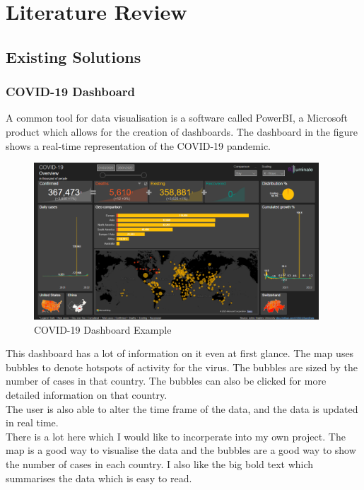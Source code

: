\documentclass{report}
\begin{document}
\newpage

\newpage

\chapter{Literature Review}
\section{Existing Solutions}
\subsection{COVID-19 Dashboard}
A common tool for data visualisation is a software called PowerBI, a Microsoft product which allows for the creation of dashboards. 
The dashboard in the figure shows a real-time representation of the COVID-19 pandemic.
\begin{center}
    \begin{figure}[h]
        \centering
        \includegraphics[width=0.95\textwidth]{PowerBI Example.png}
        \caption{COVID-19 Dashboard Example}
        \label{fig:covid19_dashboard}
    \end{figure}
\end{center}

This dashboard has a lot of information on it even at first glance. The map uses bubbles to denote hotspots of activity for the virus. The bubbles are sized by the number of cases in that country. The bubbles can also be clicked for more detailed information on that country. \\
The user is also able to alter the time frame of the data, and the data is updated in real time.\\
There is a lot here which I would like to incorperate into my own project. The map is a good way to visualise the data and the bubbles are a good way to show the number of cases in each country. I also like the big bold text which summarises the data which is easy to read.\\
\newpage
\end{document}
